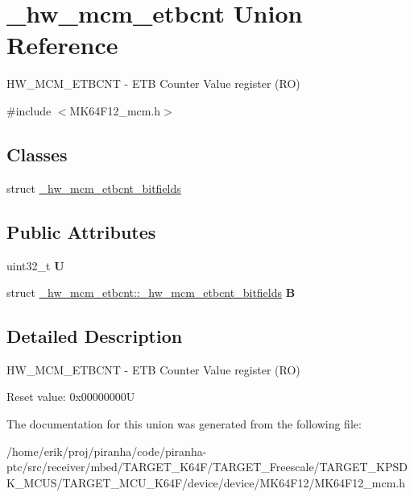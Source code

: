 \hypertarget{union__hw__mcm__etbcnt}{}\section{\+\_\+hw\+\_\+mcm\+\_\+etbcnt Union Reference}
\label{union__hw__mcm__etbcnt}


H\+W\+\_\+\+M\+C\+M\+\_\+\+E\+T\+B\+C\+NT -\/ E\+TB Counter Value register (RO)  




{\ttfamily \#include $<$M\+K64\+F12\+\_\+mcm.\+h$>$}

\subsection*{Classes}
\begin{DoxyCompactItemize}
\item 
struct \hyperlink{struct__hw__mcm__etbcnt_1_1__hw__mcm__etbcnt__bitfields}{\+\_\+hw\+\_\+mcm\+\_\+etbcnt\+\_\+bitfields}
\end{DoxyCompactItemize}
\subsection*{Public Attributes}
\begin{DoxyCompactItemize}
\item 
uint32\+\_\+t {\bfseries U}\hypertarget{union__hw__mcm__etbcnt_a1027f510af4e105e13a9caf177f3268b}{}\label{union__hw__mcm__etbcnt_a1027f510af4e105e13a9caf177f3268b}

\item 
struct \hyperlink{struct__hw__mcm__etbcnt_1_1__hw__mcm__etbcnt__bitfields}{\+\_\+hw\+\_\+mcm\+\_\+etbcnt\+::\+\_\+hw\+\_\+mcm\+\_\+etbcnt\+\_\+bitfields} {\bfseries B}\hypertarget{union__hw__mcm__etbcnt_aca1f87c38932e89d6ba7deb95e2bb2a0}{}\label{union__hw__mcm__etbcnt_aca1f87c38932e89d6ba7deb95e2bb2a0}

\end{DoxyCompactItemize}


\subsection{Detailed Description}
H\+W\+\_\+\+M\+C\+M\+\_\+\+E\+T\+B\+C\+NT -\/ E\+TB Counter Value register (RO) 

Reset value\+: 0x00000000U 

The documentation for this union was generated from the following file\+:\begin{DoxyCompactItemize}
\item 
/home/erik/proj/piranha/code/piranha-\/ptc/src/receiver/mbed/\+T\+A\+R\+G\+E\+T\+\_\+\+K64\+F/\+T\+A\+R\+G\+E\+T\+\_\+\+Freescale/\+T\+A\+R\+G\+E\+T\+\_\+\+K\+P\+S\+D\+K\+\_\+\+M\+C\+U\+S/\+T\+A\+R\+G\+E\+T\+\_\+\+M\+C\+U\+\_\+\+K64\+F/device/device/\+M\+K64\+F12/M\+K64\+F12\+\_\+mcm.\+h\end{DoxyCompactItemize}
